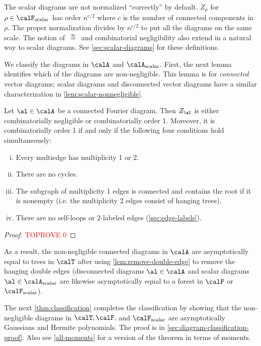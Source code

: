 \documentclass[12pt]{article}
\newcommand{\scalar}{\textnormal{scalar}}
\newcommand{\eqinf}{\,\overset{\infty}{=}\,}
\begin{document}
The scalar diagrams are not normalized
``correctly'' by default.
$Z_\rho$ for $\rho \in \calF_
{\scalar}$ has order $n^{c/2}$ where $c$ is the number
of connected components in $\rho$.
The proper normalization divides by $n^{c/2}$ to put all the diagrams on the same scale.
The notion of $\eqinf$ and combinatorial negligibility also extend in a natural
way to scalar diagrams. See \cref{sec:scalar-diagrams} for these definitions.

We classify the diagrams in $\calA$ and $\calA_\scalar$.
First, the next lemma identifies which of the diagrams are
non-negligible.
This lemma is for \emph{connected} vector diagrams; scalar diagrams
and disconnected
vector diagrams have a similar characterization
in \cref{lem:scalar-nonnegligible}.

\begin{lemma}
\label{lem:connected-nonnegligible}
Let $\al \in \calA$ be a connected Fourier diagram. Then $Z_\al$ is either combinatorially negligible or combinatorially order 1. Moreover, it is combinatorially order 1 if and only if the following four conditions hold simultaneously:
\begin{enumerate}[(i)]
    \item Every multiedge has multiplicity 1 or 2.
    \item There are no cycles.
    \item The subgraph of multiplicity 1 edges is connected and contains the root if it is nonempty (i.e. the multiplicity 2 edges consist of hanging trees).
    \item There are no self-loops or 2-labeled edges (\cref{sec:edge-labels}).
\end{enumerate}
\end{lemma}
\begin{proof}\textcolor{red}{TOPROVE 0}\end{proof}



As a result, the non-negligible connected diagrams in $\calA$ are asymptotically equal to trees in $\calT$ after using
\cref{lem:remove-double-edge} to remove the hanging
double edges (disconnected diagrams $\al \in \calA$ and scalar diagrams $\al \in \calA_\scalar$ are likewise asymptotically equal to a forest in $\calF$ or $\calF_\scalar$).

The next \cref{thm:classification} completes the classification by showing that the non-negligible diagrams in $\calT, \calF,$ and $\calF_\scalar$
are asymptotically Gaussians and Hermite polynomials.
The proof is in \cref{sec:diagram-classification-proof}.
Also see \cref{all-moments} for a version of the theorem in terms of moments.
\end{document}
